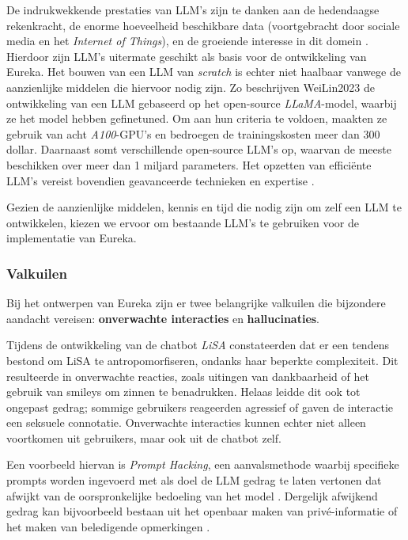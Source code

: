 De indrukwekkende prestaties van LLM's zijn te danken aan de hedendaagse rekenkracht, de enorme hoeveelheid beschikbare data (voortgebracht door sociale media en het \textit{Internet of Things}), en de groeiende interesse in dit domein \autocite{Zohuri2022, Naveed2023}. Hierdoor zijn LLM's uitermate geschikt als basis voor de ontwikkeling van Eureka. Het bouwen van een LLM van \textit{scratch} is echter niet haalbaar vanwege de aanzienlijke middelen die hiervoor nodig zijn. Zo beschrijven WeiLin2023 de ontwikkeling van een LLM gebaseerd op het open-source \textit{LLaMA}-model, waarbij ze het model hebben gefinetuned. Om aan hun criteria te voldoen, maakten ze gebruik van acht \textit{A100}-GPU's en bedroegen de trainingskosten meer dan 300 dollar. Daarnaast somt \textcite{Fourrier2024} verschillende open-source LLM's op, waarvan de meeste beschikken over meer dan 1 miljard parameters. Het opzetten van efficiënte LLM's vereist bovendien geavanceerde technieken en expertise \autocite{Naveed2023}.

Gezien de aanzienlijke middelen, kennis en tijd die nodig zijn om zelf een LLM te ontwikkelen, kiezen we ervoor om bestaande LLM's te gebruiken voor de implementatie van Eureka.

\subsubsection{Valkuilen}

Bij het ontwerpen van Eureka zijn er twee belangrijke valkuilen die bijzondere aandacht vereisen: \textbf{onverwachte interacties} en \textbf{hallucinaties}.

Tijdens de ontwikkeling van de chatbot \textit{LiSA} constateerden \textcite{Dibitonto2018} dat er een tendens bestond om LiSA te antropomorfiseren, ondanks haar beperkte complexiteit. Dit resulteerde in onverwachte reacties, zoals uitingen van dankbaarheid of het gebruik van smileys om zinnen te benadrukken. Helaas leidde dit ook tot ongepast gedrag; sommige gebruikers reageerden agressief of gaven de interactie een seksuele connotatie. Onverwachte interacties kunnen echter niet alleen voortkomen uit gebruikers, maar ook uit de chatbot zelf.

Een voorbeeld hiervan is \textit{Prompt Hacking}, een aanvalsmethode waarbij specifieke prompts worden ingevoerd met als doel de LLM gedrag te laten vertonen dat afwijkt van de oorspronkelijke bedoeling van het model \autocite{Rababah2024}. Dergelijk afwijkend gedrag kan bijvoorbeeld bestaan uit het openbaar maken van privé-informatie of het maken van beledigende opmerkingen \autocite{Naveed2023}.

